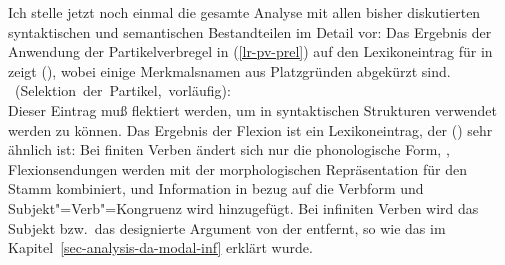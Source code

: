 Ich stelle jetzt noch einmal die gesamte Analyse mit allen bisher diskutierten syntaktischen
und semantischen Bestandteilen im Detail vor: Das Ergebnis der Anwendung der Partikelverbregel in (\ref{lr-pv-prel})
auf den Lexikoneintrag für  in  zeigt (), wobei einige
Merkmalsnamen aus Platzgründen abgekürzt sind.
%
\newsavebox{\boxxcomp}
%
\eas
\label{le-lach-+particle-prel}
\mbox{ (Selektion der Partikel, vorläufig):}\\
\zs
%
Dieser Eintrag muß flektiert werden, um in syntaktischen Strukturen verwendet werden zu können.
Das Ergebnis der Flexion ist ein Lexikoneintrag, der () sehr ähnlich ist: Bei finiten
Verben ändert sich nur die phonologische Form, \dash, Flexionsendungen werden mit der morphologischen
Repräsentation für den Stamm kombiniert, und Information in bezug auf die Verbform und Subjekt"=Verb"=Kongruenz
wird hinzugefügt. Bei infiniten Verben wird das Subjekt bzw.\ das designierte Argument
von der \subcatl entfernt, so wie das im Kapitel~\ref{sec-analysis-da-modal-inf} erklärt wurde.
 
